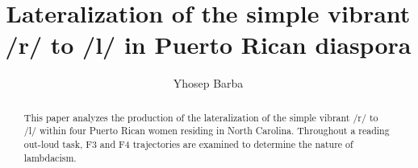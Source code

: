 \title{Lateralization of the simple vibrant /r/ to /l/ in Puerto Rican diaspora}
\author{Yhosep Barba}


\maketitle

\begin{abstract}
This paper analyzes the production of the lateralization of the simple vibrant /r/ to /l/  within four Puerto Rican women residing in North Carolina. Throughout a reading out-loud task, F3 and F4 trajectories are examined to determine the nature of lambdacism.
\end{abstract}


